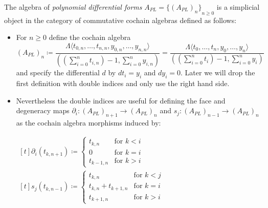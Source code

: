  \begin{Definition}
  The algebra of \emph{polynomial differential forms} $A_{PL} = {\lbrace (A_{PL})_n\rbrace}_{n \geq 0}$ is a
  simplicial object in the category of commutative cochain algebras defined as follows: \newline
  \begin{itemize}
   \item For $n \geq 0$ define the cochain algebra 
      $$(A_{PL})_n \coloneqq \frac{\Lambda \langle t_{0,n}, \dotsc, t_{n,n}, y_{0,n}, \dotsc, y_{n,n} \rangle}
      {((\sum_{i = 0}^n t_{i,n}) - 1, \sum_{i = 0}^n y_{i,n})}
      = \frac{\Lambda \langle t_0, \dotsc, t_n, y_0, \dotsc, y_n \rangle}
      {((\sum_{i = 0}^n t_i) - 1, \sum_{i = 0}^n y_i)} $$
      and specify the differential $d$ by $dt_i = y_i$ and $dy_i = 0$. Later we will drop the first definition with
      double indices and only use the right hand side.
   \item Nevertheless the double indices are useful for defining the face and degeneracy maps 
   $ \partial_i \colon (A_{PL})_{n+1} \to (A_{PL})_n$ and $ s_j \colon (A_{PL})_{n-1} \to (A_{PL})_n$
   as the cochain algebra morphisms induced by:
   
    \begin{center}
      \hfill
      $\!\begin{aligned}[t]
       \partial_i (t_{k,n+1}) \coloneqq \begin{cases}
                                      t_{k,n}  	&\text{for $k < i$} \\
                                      0		&\text{for $k = i$}\\
                                      t_{k-1,n} &\text{for $k > i$}
				      \end{cases}
      \end{aligned}$\hfill\hfill
      $\!\begin{aligned}[t]
       s_j (t_{k,n-1}) \coloneqq \begin{cases}
                                      t_{k,n}  			&\text{for $k < j$} \\
                                      t_{k,n} + t_{k+1,n}	&\text{for $k = i$}\\
                                      t_{k+1,n} 		&\text{for $k > i$}
				      \end{cases}
      \end{aligned}$\hfill
    \end{center}    
  \end{itemize}
 \end{Definition}

